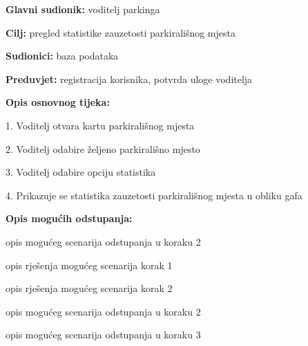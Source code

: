 					\noindent {}
					\begin{packed_item}
						
						\item \textbf{Glavni sudionik: }voditelj parkinga
						\item  \textbf{Cilj:} pregled statistike zauzetosti parkirališnog mjesta
						\item  \textbf{Sudionici:} baza podataka
						\item  \textbf{Preduvjet:} registracija korisnika, potvrda uloge voditelja 
						\item  \textbf{Opis osnovnog tijeka:}
						
						\item[] \begin{packed_enum}
							
							\item 1. Voditelj otvara kartu parkirališnog mjesta
							\item 2. Voditelj odabire željeno parkirališno mjesto
							\item 3. Voditelj odabire opciju statistika
							\item 4. Prikazuje se statistika zauzetosti parkirališnog mjesta u obliku gafa
						\end{packed_enum}
						
						\item  \textbf{Opis mogućih odstupanja:}
						
						\item[] \begin{packed_item}
							
							\item[2.a] opis mogućeg scenarija odstupanja u koraku 2
							\item[] \begin{packed_enum}
								
								\item opis rješenja mogućeg scenarija korak 1
								\item opis rješenja mogućeg scenarija korak 2
								
							\end{packed_enum}
							\item[2.b] opis mogućeg scenarija odstupanja u koraku 2
							\item[3.a] opis mogućeg scenarija odstupanja  u koraku 3
							
						\end{packed_item}
					\end{packed_item}
					
